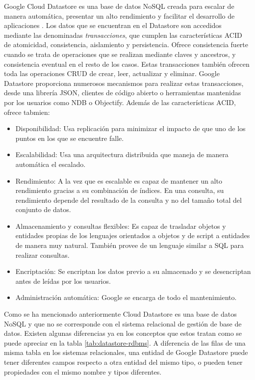 Google Cloud Datastore es una base de datos NoSQL creada para escalar de manera automática, presentar un alto rendimiento y facilitar el desarrollo de aplicaciones \cite{Datastore}. Los datos que se encuentran en el Datastore son accedidos mediante las denominadas \textit{transacciones}, que cumplen las características \acs{ACID} de atomicidad, consistencia, aislamiento y persistencia. Ofrece consistencia fuerte cuando se trata de operaciones que se realizan mediante claves y ancestros, y consistencia eventual en el resto de los casos. Estas transacciones también ofrecen toda las operaciones \acs{CRUD} de crear, leer, actualizar y eliminar. Google Datastore proporciona numerosos mecanismos para realizar estas transacciones, desde una librería JSON, clientes de código abierto o herramientas mantenidas por los usuarios como NDB o Objectify. Además de las características \acs{ACID}, ofrece tabmien:

\begin{itemize}
\item Disponibilidad: Usa replicación para minimizar el impacto de que uno de los puntos en los que se encuentre falle.
\item Escalabilidad: Usa una arquitectura distribuida que maneja de manera automática el escalado.
\item Rendimiento: A la vez que es escalable es capaz de mantener un alto rendimiento gracias a su combinación de índices. En una consulta, su rendimiento depende del resultado de la consulta y no del tamaño total del conjunto de datos.
\item Almacenamiento y consultas flexibles: Es capaz de trasladar objetos y entidades propias de los lenguajes orientados a objetos y de script a entidades de manera muy natural. También provee de un lenguaje similar a SQL para realizar consultas.
\item Encriptación: Se encriptan los datos previo a su almacenado y se desencriptan antes de leídas por los usuarios.
\item Administración automática: Google se encarga de todo el mantenimiento.
\end{itemize} 

Como se ha mencionado anteriormente Cloud Datastore es una base de datos NoSQL y que no se corresponde con el sistema relacional de gestión de base de datos. Existen algunas diferencias ya en los conceptos que estos tratan como se puede apreciar en la tabla \ref{tab:datastore-rdbms}. A diferencia de las filas de una misma tabla en los sistemas relacionales, una entidad de Google Datastore puede tener diferentes campos respecto a otra entidad del mismo tipo, o pueden tener propiedades con el mismo nombre y tipos diferentes. 

